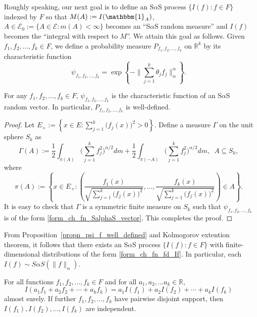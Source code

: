 \documentclass[12pt]{amsart}
\begin{document}
Roughly speaking, our next goal is to define an S$\alpha$S process $\{I(f): f \in F\}$ indexed by $F$ so that $M(A):=I(\mathbbm{1}_A)$, $A \in \mathcal{E}_0:=\{A \in \mathcal{E}: m(A)<\infty\}$ becomes an ``S$\alpha$S random measure'' and $I(f)$ becomes the ``integral with respect to $M$''. We attain this goal as follows. Given $f_1, f_2, \ldots, f_k \in F$, we define a probability measure $P_{f_1, f_2,\ldots, f_k}$ on $\mathbb{R}^k$ by its characteristic function
\begin{equation}
\psi_{f_1, f_2,\ldots, f_k}=\exp{\left\{-\Big\|\sum_{j=1}^k \theta_j f_j\Big\|_\alpha^\alpha\right\}}. \label{form_ch_fn_fd_If}
\end{equation}

\begin{propn} \label{propn_psi_f_well_defined} For any $f_1, f_2, \ldots, f_k \in F$, $\psi_{f_1, f_2,\ldots, f_k}$ is the characteristic function of an S$\alpha$S random vector. In particular, $P_{f_1, f_2,\ldots, f_k}$ is well-defined.
\end{propn}

\begin{proof}  Let $E_{+}:=\left\{x \in E: \sum_{j=1}^k \big(f_j(x)\big)^2>0\right\}$. Define a measure $\Gamma$ on the unit sphere $S_k$ as
\[
\Gamma(A):= \frac{1}{2} \int_{\pi(A)}\Big(\sum_{j=1}^k f_j^2\Big)^{\alpha/2} dm + \frac{1}{2} \int_{\pi(-A)} \Big(\sum_{j=1}^k f_j^2\Big)^{\alpha/2} dm,\;\;A \subseteq S_k,
\]
where
\[
\pi(A):= \left\{x \in E_{+}: \left(\frac{f_1(x)}{\sqrt{\sum_{j=1}^k \big(f_j(x)\big)^2}},  \ldots, \frac{f_k(x)}{\sqrt{\sum_{j=1}^k \big(f_j(x)\big)^2}}\right) \in A\right\}.
\]
It is easy to check that $\Gamma$ is a symmetric finite measure on $S_k$ such that $\psi_{f_1, f_2,\ldots, f_k}$ is of the form \eqref{form_ch_fn_SalphaS_vector}. This completes the proof.
\end{proof}

From Proposition~\ref{propn_psi_f_well_defined} and Kolmogorov extention theorem, it follows that there exists an S$\alpha$S process $\{I(f): f \in F\}$ with finite-dimensional distributions of the form \eqref{form_ch_fn_fd_If}. In particular, each $I(f) \sim S\alpha S(\|f\|_\alpha)$.

\begin{propn} \label{exc_If_lin_ind_sct} For all functions $f_1, f_2, \ldots, f_k \in F$ and for all $a_1, a_2, \ldots a_k\in \mathbb{R}$,
\[
I(a_1 f_1 + a_2 f_2 + \cdots + a_k f_k) = a_1 I(f_1) + a_2 I(f_2) + \cdots + a_k I(f_k)
\]
almost surely. If further $f_1, f_2, \ldots, f_k$ have pairwise disjoint support, then $I(f_1), I(f_2), \ldots, I(f_k)$ are independent.
\end{propn}
\end{document}
